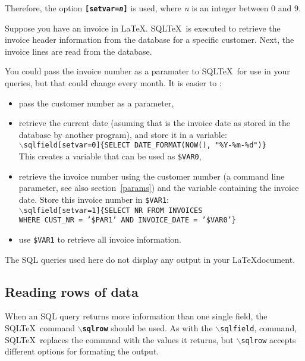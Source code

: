 \documentclass{article}
\newcommand{\bs}{\ensuremath{\backslash}}
\newcommand{\vs}{\vspace{3mm}}
\begin{document}
Therefore, the option \texttt{\textbf{[setvar=\textit{n}]}} is used, where \textit{n} is an integer between
0 and 9.

\vs

Suppose you have an invoice in \LaTeX. SQL\TeX\ is executed to retrieve the invoice header information
from the database for a specific customer. Next, the invoice lines are read from the database.

You could pass the invoice number as a paramater to SQL\TeX\ for use in your queries, but that could
change every month. It is easier to :\\
\begin{itemize}
\item pass the customer number as a parameter,
\item retrieve the current date (asuming that is the invoice date as stored in
the database by another program), and store it in a variable: \\
\texttt{\bs sqlfield[setvar=0]\{SELECT DATE\_FORMAT(NOW(), "\%Y-\%m-\%d")\}} \\
This creates a variable that can be used as \texttt{\$VAR0},
\item retrieve the invoice number using the customer number (a command line parameter,
see also section~\ref{params}) and the variable containing the invoice date.
Store this invoice number in \texttt{\$VAR1}: \\
\texttt{\bs sqlfield[setvar=1]\{SELECT NR FROM INVOICES \\
WHERE CUST\_NR = '\$PAR1' AND INVOICE\_DATE = '\$VAR0'\}}
\item use \texttt{\$VAR1} to retrieve all invoice information.
\end{itemize}

\vs

The SQL queries used here do not display any output in your \LaTeX document.


\subsection{Reading rows of data}\label{sqlrow}

When an SQL query returns more information than one single field, the SQL\TeX\
command \texttt{\textbf{\bs sqlrow}} should be used. As with the \texttt{\bs sqlfield},
command, SQL\TeX\ replaces the command with the values it returns, but \texttt{\bs sqlrow}
accepts different options for formating the output.

\vs
\end{document}
